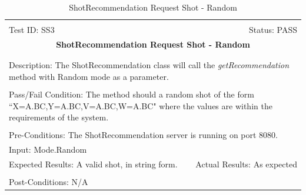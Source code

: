 \documentclass[11pt]{article}
\begin{document}
\begin{center}
\begin{table}[H]
\begin{tabular}{|l r|}\hline&\\[-2mm]
	Test ID: SS3	&Status: PASS\\[-3mm]
	\multicolumn{2}{|c|}{\textbf{\large{ShotRecommendation Request Shot - Random}}}\\&\\\hline&\\[-3mm]
	\multicolumn{2}{|p{\textwidth}|}{Description: The ShotRecommendation class will call the \textit{getRecommendation} method with Random mode as a parameter.}\\[1mm]\hline&\\[-3mm]
	\multicolumn{2}{|p{\textwidth}|}{Pass/Fail Condition: The method should a random shot of the form ``X=A.BC,Y=A.BC,V=A.BC,W=A.BC" where the values are within the requirements of the system.}\\[1mm]\hline&\\[-3mm]
	\multicolumn{2}{|p{\textwidth}|}{Pre-Conditions: The ShotRecommendation server is running on port 8080.}\\[4mm]
	\multicolumn{2}{|p{\textwidth}|}{Input: Mode.Random}\\[2mm]\hline
	\multicolumn{1}{|p{0.49\textwidth}}{Expected Results: A valid shot, in string form.}	&\multicolumn{1}{|p{0.45\textwidth}|}{Actual Results: As expected}\\\hline&\\[-3mm]
	\multicolumn{2}{|p{\textwidth}|}{Post-Conditions: N/A}\\\hline
\end{tabular}
\caption{ShotRecommendation Request Shot - Random}
\end{table}
\end{center}
\end{document}
